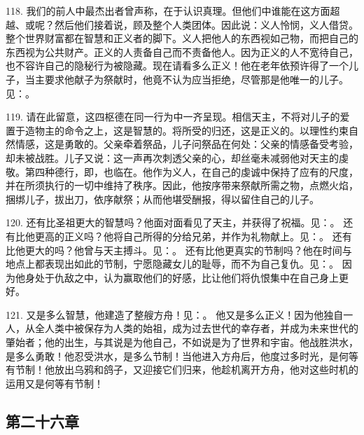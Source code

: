 118. 我们的前人中最杰出者曾声称，在于认识真理。但他们中谁能在这方面超越、或呢？然后他们接着说，顾及整个人类团体。因此说：义人怜悯，义人借贷。整个世界财富都在智慧和正义者的脚下。义人把他人的东西视如己物，而把自己的东西视为公共财产。正义的人责备自己而不责备他人。因为正义的人不宽待自己，也不容许自己的隐秘行为被隐藏。现在请看多么正义！他在老年依预许得了一个儿子，当主要求他献子为祭献时，他竟不认为应当拒绝，尽管那是他唯一的儿子。见：。\par

119. 请在此留意，这四枢德在同一行为中一齐呈现。相信天主，不将对儿子的爱置于造物主的命令之上，这是智慧的。将所受的归还，这是正义的。以理性约束自然情感，这是勇敢的。父亲牵着祭品，儿子问祭品在何处：父亲的情感备受考验，却未被战胜。儿子又说：这一声再次刺透父亲的心，却丝毫未减弱他对天主的虔敬。第四种德行，即，也临在。他作为义人，在自己的虔诚中保持了应有的尺度，并在所须执行的一切中维持了秩序。因此，他按序带来祭献所需之物，点燃火焰，捆绑儿子，拔出刀，依序献祭；从而他堪受酬报，得以留住自己的儿子。\par

120. 还有比圣祖更大的智慧吗？他面对面看见了天主，并获得了祝福。见：。 还有比他更高的正义吗？他将自己所得的分给兄弟，并作为礼物献上。见：。 还有比他更大的吗？他曾与天主搏斗。见：。 还有比他更真实的节制吗？他在时间与地点上都表现出如此的节制，宁愿隐藏女儿的耻辱，而不为自己复仇。见：。 因为他身处于仇敌之中，认为赢取他们的好感，比让他们将仇恨集中在自己身上更好。\par

121. 又是多么智慧，他建造了整艘方舟！见：。 他又是多么正义！因为他独自一人，从全人类中被保存为人类的始祖，成为过去世代的幸存者，并成为未来世代的肇始者；他的出生，与其说是为他自己，不如说是为了世界和宇宙。他战胜洪水，是多么勇敢！他忍受洪水，是多么节制！当他进入方舟后，他度过多时光，是何等有节制！他放出乌鸦和鸽子，又迎接它们归来，他趁机离开方舟，他对这些时机的运用又是何等有节制！\par


\subsection{第二十六章}

